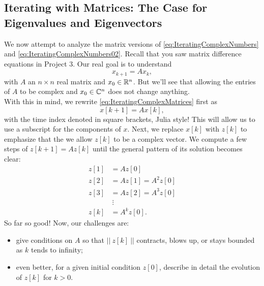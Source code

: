 \subsection{Iterating with Matrices: The Case for Eigenvalues and Eigenvectors}
\label{sec:CaseEigenvectors}

We now attempt to analyze the matrix versions of \eqref{eq:IteratingComplexNumbers} and \eqref{eq:IteratingComplexNumbers02}. Recall that you saw matrix difference equations in Project 3. Our real goal is to understand
\begin{equation}
    \label{eq:IteratingComplexMatrices}
x_{k+1}= A x_k,
\end{equation}
with $A$ an $n \times n$ real matrix and $x_0 \in \mathbb R^n$. But we'll see that allowing the entries of $A$ to be complex and $x_0 \in \mathbb C^n$ does not change anything. \\

With this in mind, we rewrite \eqref{eq:IteratingComplexMatrices} first as 
$$x[k+1]= A x[k], $$
with the time index denoted in square brackets, Julia style! This will allow us to use a subscript for the components of $x$. Next, we replace $x[k]$ with $z[k]$ to emphasize that the we allow $z[k]$ to be a complex vector. We compute a few steps of $z[k+1]=A z[k]$ until the general pattern of its solution becomes clear:
\begin{equation}
    \label{eq:IteratingComplexMatricesB}
    \begin{aligned}
   z[1]&= A z[0]\\
   z[2]& = A z[1] = A^2 z[0] \\
   z[3]&= A z[2] = A^3 z[0]\\
   &~\vdots \\
   z[k]&=A^k z[0].
    \end{aligned}
\end{equation}
So far so good! Now, our challenges are:
\begin{itemize}
    \item give conditions on $A$ so that $||~z[k]~ ||$ contracts, blows up, or stays bounded as $k$ tends to infinity;
    \item even better, for a given initial condition $z[0]$, describe in detail the evolution of $z[k]$ for $k > 0$.
\end{itemize}

